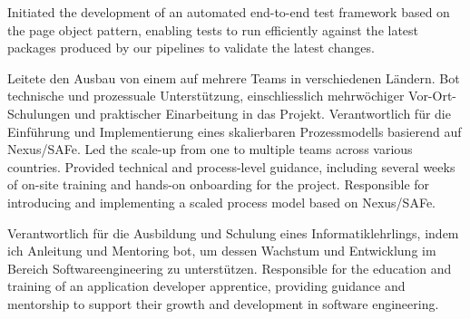 \begin{cventries}
{\begin{cvitems}
{{				}
				{
					Initiated the development of an automated end-to-end test framework based on the page object pattern, enabling tests to run efficiently against the latest packages produced by our pipelines to validate the latest changes.
				}
			}	
			\item{
				{
					Leitete den Ausbau von einem auf mehrere Teams in verschiedenen Ländern. Bot technische und prozessuale Unterstützung, einschliesslich mehrwöchiger Vor-Ort-Schulungen und praktischer Einarbeitung in das Projekt. Verantwortlich für die Einführung und Implementierung eines skalierbaren Prozessmodells basierend auf Nexus/SAFe.
				}
				{
					Led the scale-up from one to multiple teams across various countries. Provided technical and process-level guidance, including several weeks of on-site training and hands-on onboarding for the project. Responsible for introducing and implementing a scaled process model based on Nexus/SAFe.
				}
			}		
			\item {
				{
					Verantwortlich für die Ausbildung und Schulung eines Informatiklehrlings, indem ich Anleitung und Mentoring bot, um dessen Wachstum und Entwicklung im Bereich Softwareengineering zu unterstützen.
				}
				{
					Responsible for the education and training of an application developer apprentice, providing guidance and mentorship to support their growth and development in software engineering.
				}
			}  		
		\end{cvitems}
	}	
\end{cventries}

